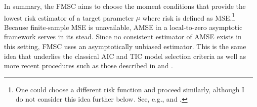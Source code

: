 In summary, the FMSC aims to choose the moment conditions that provide the lowest risk estimator of a target parameter $\mu$ where risk is defined as MSE.\footnote{One could choose a different risk function and proceed similarly, although I do not consider this idea further below. See, e.g., \cite{Claeskens2006} and \cite{ClaeskensHjort2008}.}
Because finite-sample MSE is unavailable, AMSE in a local-to-zero asymptotic framework serves in its stead.
Since no consistent estimator of AMSE exists in this setting, FMSC uses an asymptotically unbiased estimator.
This is the same idea that underlies the classical AIC and TIC model selection criteria as well as more recent procedures such as those described in \cite{ClaeskensHjort2003} and \cite{Schorfheide2005}.

